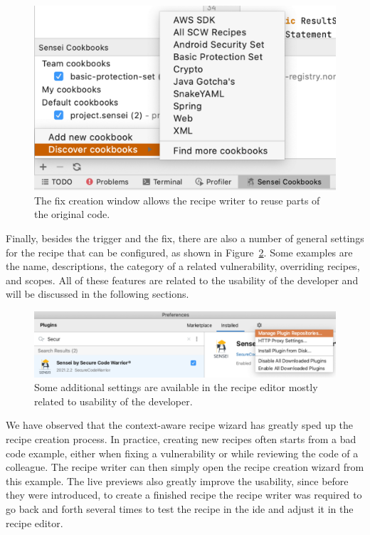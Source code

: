 \begin{figure}
  \centering
  \includegraphics[width=\textwidth,page=5]{04-tools/figures/figures1.pdf}
  \caption[Fix creation window]{The fix creation window allows the recipe writer to reuse parts of the original code.}
  \label{fig:createfix} 
\end{figure}

Finally, besides the trigger and the fix, there are also a number of general settings for the recipe that can be configured, as shown in Figure~\ref{fig:generalsettings}.
Some examples are the name, descriptions, the category of a related vulnerability, overriding recipes, and scopes.
All of these features are related to the usability of the developer and will be discussed in the following sections.

\begin{figure}
  \centering
  \includegraphics[width=\textwidth,page=8]{04-tools/figures/figures2.pdf}
  \caption[General recipe settings]{Some additional settings are available in the recipe editor mostly related to usability of the developer.}
  \label{fig:generalsettings} 
\end{figure}

We have observed that the context-aware recipe wizard has greatly sped up the recipe creation process.
In practice, creating new recipes often starts from a bad code example, either when fixing a vulnerability or while reviewing the code of a colleague.
The recipe writer can then simply open the recipe creation wizard from this example.
The live previews also greatly improve the usability, since before they were introduced, to create a finished recipe the recipe writer was required to go back and forth several times to test the recipe in the \gls{ide} and adjust it in the recipe editor.

